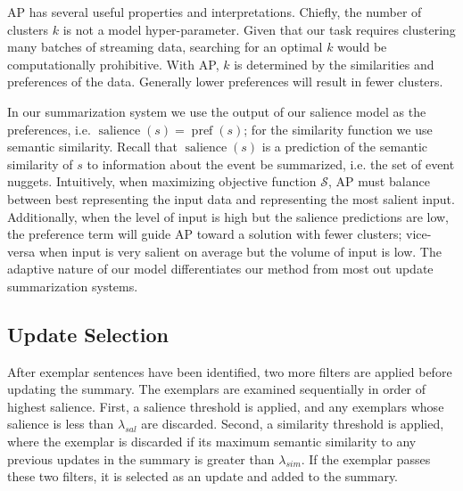 AP has several useful properties and interpretations. Chiefly, the number
of clusters $k$ is not a model hyper-parameter. Given that our task requires
clustering many batches of streaming data, searching for an optimal $k$ 
would be computationally prohibitive. With AP, $k$ is determined by the
similarities and preferences of the data. Generally lower preferences will
result in fewer clusters.  


In our summarization system we use the output of our salience model as 
the preferences, i.e.
$\operatorname{salience}(s) = \operatorname{pref}(s)$; for the similarity 
function we use semantic similarity. Recall that $\operatorname{salience}(s)$
is a prediction of the semantic similarity of $s$ to information about the 
event be summarized, i.e. the set of event nuggets.
Intuitively, when maximizing objective function $\mathcal{S}$, AP must balance
between best representing the input data and representing the most salient
input. Additionally, when the level of input is high but the salience
predictions are low, the preference term will guide AP toward a solution
with fewer clusters; vice-versa when input is very salient on average but
the volume of input is low. The adaptive nature of our model differentiates
our method from most out update summarization systems.




\subsection{Update Selection}
\label{sec:upsel}

After exemplar sentences have been identified, two more filters are applied 
before updating the summary. The exemplars are examined
sequentially in order of highest salience. First, a salience threshold 
is applied, and any exemplars whose salience is less than
$\lambda_{sal}$ are discarded. Second, a similarity threshold 
is applied, where the exemplar is discarded if its
maximum semantic similarity to any previous updates in the summary is
greater than $\lambda_{sim}$. If the exemplar passes these two filters,
it is selected as an update and added to the summary.




